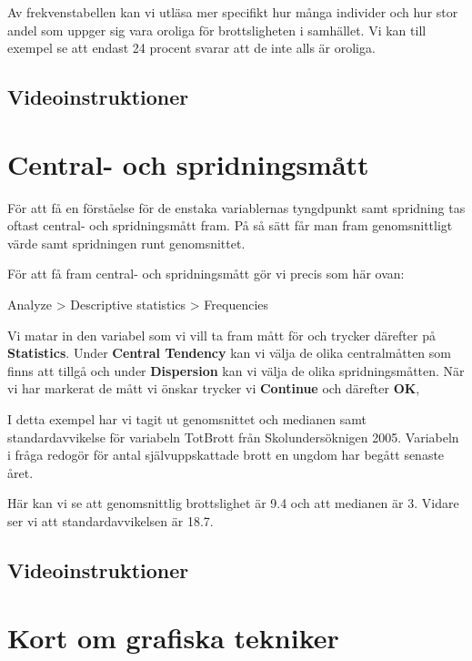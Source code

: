 \documentclass[
]{book}
\begin{document}
Av frekvenstabellen kan vi utläsa mer specifikt hur många individer och hur stor andel som uppger sig
vara oroliga för brottsligheten i samhället. Vi kan till exempel se att endast 24 procent svarar att de
inte alls är oroliga.

\hypertarget{videoinstruktioner-3}{%
\subsection{Videoinstruktioner}\label{videoinstruktioner-3}}

\hypertarget{central--och-spridningsmuxe5tt}{%
\section{Central- och spridningsmått}\label{central--och-spridningsmuxe5tt}}

För att få en förståelse för de enstaka variablernas tyngdpunkt samt spridning tas oftast central- och spridningsmått fram. På så sätt får man fram genomsnittligt värde samt spridningen runt genomsnittet.

För att få fram central- och spridningsmått gör vi precis som här ovan:

Analyze \textgreater{} Descriptive statistics \textgreater{} Frequencies

Vi matar in den variabel som vi vill ta fram mått för och trycker därefter på \textbf{Statistics}. Under \textbf{Central Tendency} kan vi välja de olika centralmåtten som finns att tillgå och under \textbf{Dispersion} kan vi välja de olika spridningsmåtten. När vi har markerat de mått vi önskar trycker vi \textbf{Continue} och därefter \textbf{OK},

I detta exempel har vi tagit ut genomsnittet och medianen samt standardavvikelse för variabeln TotBrott från Skolundersöknigen 2005. Variabeln i fråga redogör för antal självuppskattade brott en ungdom har begått senaste året.

Här kan vi se att genomsnittlig brottslighet är 9.4 och att medianen är 3. Vidare ser vi att standardavvikelsen är 18.7.

\hypertarget{videoinstruktioner-4}{%
\subsection{Videoinstruktioner}\label{videoinstruktioner-4}}

\hypertarget{kort-om-grafiska-tekniker}{%
\section{Kort om grafiska tekniker}\label{kort-om-grafiska-tekniker}}
\end{document}

